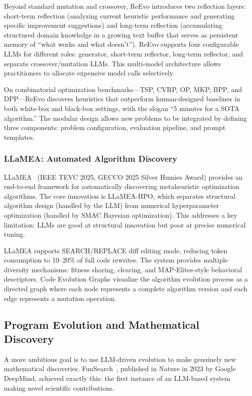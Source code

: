 Beyond standard mutation and crossover, ReEvo introduces two reflection layers: short-term reflection (analyzing current heuristic performance and generating specific improvement suggestions) and long-term reflection (accumulating structured domain knowledge in a growing text buffer that serves as persistent memory of ``what works and what doesn't''). ReEvo supports four configurable LLMs for different roles: generator, short-term reflector, long-term reflector, and separate crossover/mutation LLMs. This multi-model architecture allows practitioners to allocate expensive model calls selectively.

On combinatorial optimization benchmarks---TSP, CVRP, OP, MKP, BPP, and DPP---ReEvo discovers heuristics that outperform human-designed baselines in both white-box and black-box settings, with the slogan ``5 minutes for a SOTA algorithm.'' The modular design allows new problems to be integrated by defining three components: problem configuration, evaluation pipeline, and prompt templates.

\subsubsection{LLaMEA: Automated Algorithm Discovery}

LLaMEA~\citep{llamea2025} (IEEE TEVC 2025, GECCO 2025 Silver Humies Award) provides an end-to-end framework for automatically discovering metaheuristic optimization algorithms. The core innovation is LLaMEA-HPO, which separates structural algorithm design (handled by the LLM) from numerical hyperparameter optimization (handled by SMAC Bayesian optimization). This addresses a key limitation: LLMs are good at structural innovation but poor at precise numerical tuning.

LLaMEA supports SEARCH/REPLACE diff editing mode, reducing token consumption to 10--20\% of full code rewrites. The system provides multiple diversity mechanisms: fitness sharing, clearing, and MAP-Elites-style behavioral descriptors. Code Evolution Graphs visualize the algorithm evolution process as a directed graph where each node represents a complete algorithm version and each edge represents a mutation operation.

\subsection{Program Evolution and Mathematical Discovery}
\label{sec:funsearch}

A more ambitious goal is to use LLM-driven evolution to make genuinely new mathematical discoveries. FunSearch~\citep{romera2024mathematical}, published in Nature in 2023 by Google DeepMind, achieved exactly this: the first instance of an LLM-based system making novel scientific contributions.

